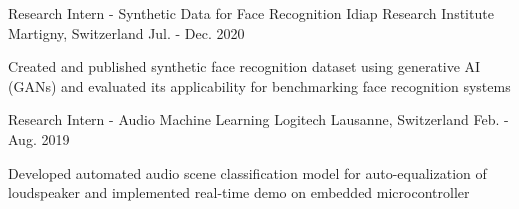 \begin{cventries}
  \cventry
    {Research Intern - Synthetic Data for Face Recognition} %
    {Idiap Research Institute} %
    {Martigny, Switzerland} %
    {Jul. - Dec. 2020} %
    {
      \begin{cvitems} %
        \item {Created and published synthetic face recognition dataset using generative AI (GANs) and evaluated its applicability for benchmarking face recognition systems}
      \end{cvitems}
    }

  \cventry
    {Research Intern - Audio Machine Learning} %
    {Logitech} %
    {Lausanne, Switzerland} %
    {Feb. - Aug. 2019} %
    {
      \begin{cvitems} %
        \item {Developed automated audio scene classification model for auto-equalization of loudspeaker and implemented real-time demo on embedded microcontroller}
      \end{cvitems}
    }

\end{cventries}
